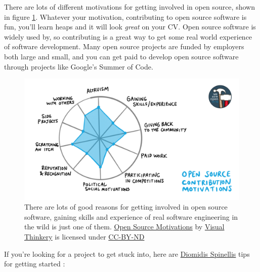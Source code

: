 \documentclass[
]{book}
\begin{document}
There are lots of different motivations for getting involved in open source, shown in figure \ref{fig:opensource-fig}. Whatever your motivation, contributing to open source software is fun, you'll learn heaps and it will look \emph{great} on your CV. Open source software is widely used by, so contributing is a great way to get some real world experience of software development. Many open source projects are funded by employers both large and small, and you can get paid to develop open source software through projects like Google's Summer of Code. \citep{gsoc}

\begin{figure}

{\centering \includegraphics[width=1\linewidth]{images/OS-contribution-motivations-1200x675} 

}

\caption{There are lots of good reasons for getting involved in open source software, gaining skills and experience of real software engineering in the wild is just one of them. \href{https://bryanmmathers.com/open-source-motivations}{Open Source Motivations} by \href{https://visualthinkery.com}{Visual Thinkery} is licensed under \href{https://creativecommons.org/licenses/by-nd/4.0/}{CC-BY-ND}}\label{fig:opensource-fig}
\end{figure}



If you're looking for a project to get stuck into, here are \href{https://en.wikipedia.org/wiki/Diomidis_Spinellis}{Diomidis Spinellis} tips for getting started \citep{Spinellis}:
\end{document}
